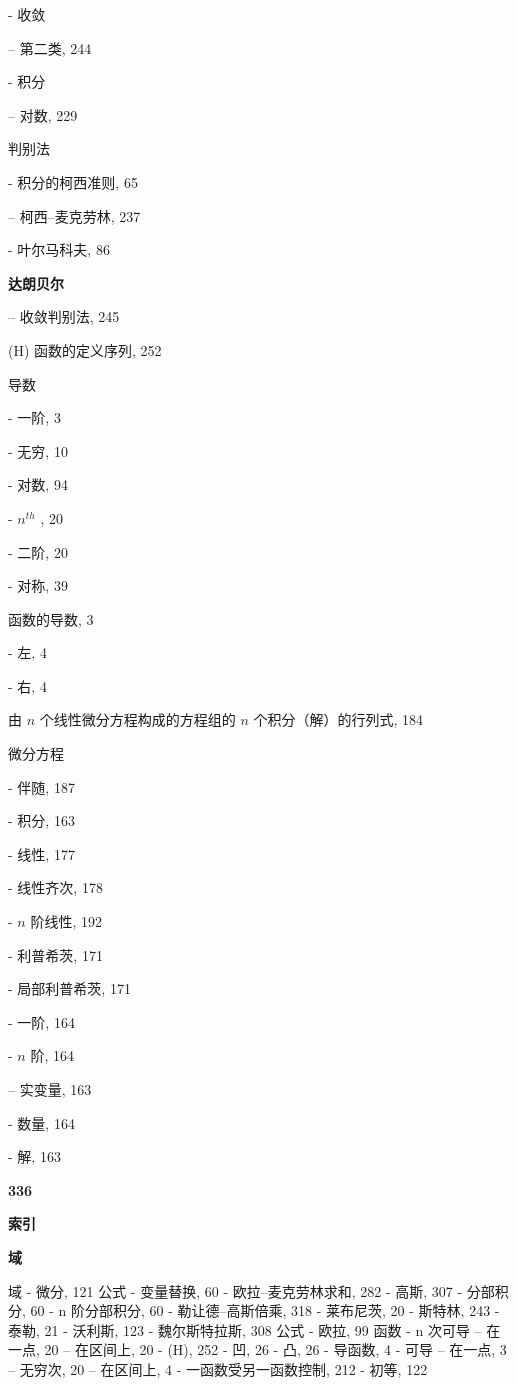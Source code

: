 - 收敛

-- 第二类, 244

- 积分

-- 对数, 229

判别法

- 积分的柯西准则, 65

-- 柯西–麦克劳林, 237

- 叶尔马科夫, 86

\par\noindent\textbf{达朗贝尔}\par

-- 收敛判别法, 245

(H) 函数的定义序列, 252

导数

- 一阶, 3

- 无穷, 10

- 对数, 94

- \(n^{th}\) , 20

- 二阶, 20

- 对称, 39

函数的导数, 3

- 左, 4

- 右, 4

由 \(n\) 个线性微分方程构成的方程组的 \(n\) 个积分（解）的行列式, 184

微分方程

- 伴随, 187

- 积分, 163

- 线性, 177

- 线性齐次, 178

- \(n\) 阶线性, 192

- 利普希茨, 171

- 局部利普希茨, 171

- 一阶, 164

- \(n\) 阶, 164

-- 实变量, 163

- 数量, 164

- 解, 163

\par\noindent\textbf{336}\par

\par\noindent\textbf{索引}\par

\par\noindent\textbf{域}\par

域 - 微分, 121 公式 - 变量替换, 60 - 欧拉–麦克劳林求和, 282 - 高斯, 307 - 分部积分, 60 - n 阶分部积分, 60 - 勒让德–高斯倍乘, 318 - 莱布尼茨, 20 - 斯特林, 243 - 泰勒, 21 - 沃利斯, 123 - 魏尔斯特拉斯, 308 公式 - 欧拉, 99 函数 - n 次可导 -- 在一点, 20 -- 在区间上, 20 - (H), 252 - 凹, 26 - 凸, 26 - 导函数, 4 - 可导 -- 在一点, 3 -- 无穷次, 20 -- 在区间上, 4 - 一函数受另一函数控制, 212 - 初等, 122

